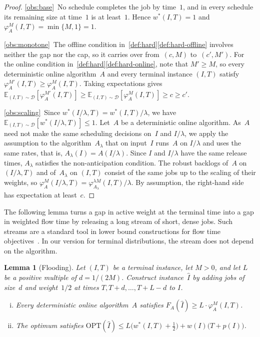 \documentclass[11pt,letterpaper]{article}
\makeatletter
\renewcommand\paragraph{\@startsection{paragraph}{4}{\z@}{\parskip}{-1em}{\normalfont\normalsize\bfseries}}
\newtheorem{lemma}[theorem]{Lemma}
\theoremstyle{definition}
\theoremstyle{remark}
\newcommand{\OPT}{{\mathrm{OPT}}}
\newcommand{\E}{\mathbb{E}}
\newcommand{\cD}{\mathcal{D}}
\makeatother
\begin{document}
\begin{proof}
\ref{obs:base}~No schedule completes the job by time~$1$, and in every schedule its remaining size at time~$1$ is at least~$1$. Hence $w^*(I,T)=1$ and $\varphi_A^M(I,T)=\min\{M,1\}=1$.

\ref{obs:monotone}~The offline condition in~\cref{def:hard}\ref{def:hard-offline} involves neither the gap nor the cap, so it carries over from~$(c,M)$ to~$(c',M')$. For the online condition in~\cref{def:hard}\ref{def:hard-online}, note that $M'\ge M$, so every deterministic online algorithm~$A$ and every terminal instance $(I,T)$ satisfy $\varphi_A^{M'}(I,T)\ge\varphi_A^M(I,T)$. Taking expectations gives $\E_{(I,T)\sim\cD}[\varphi_A^{M'}(I,T)]\ge\E_{(I,T)\sim\cD}[\varphi_A^M(I,T)]\ge c\ge c'$.

\ref{obs:scaling}~Since $w^*(I/\lambda,T)=w^*(I,T)/\lambda$, we have $\E_{(I,T)\sim\cD}[w^*(I/\lambda,T)]\le1$. Let~$A$ be a deterministic online algorithm. As~$A$ need not make the same scheduling decisions on~$I$ and $I/\lambda$, we apply the assumption to the algorithm~$A_\lambda$ that on input~$I$ runs~$A$ on $I/\lambda$ and uses the same rates, that is, $A_\lambda(I)=A(I/\lambda)$. Since $I$ and $I/\lambda$ have the same release times, $A_\lambda$ satisfies the non-anticipation condition. The robust backlogs of~$A$ on $(I/\lambda,T)$ and of~$A_\lambda$ on $(I,T)$ consist of the same jobs up to the scaling of their weights, so $\varphi_A^M(I/\lambda,T)=\varphi_{A_\lambda}^{\lambda M}(I,T)/\lambda$. By assumption, the right-hand side has expectation at least~$c$.
\end{proof}

\paragraph{Flooding.}
The following lemma turns a gap in active weight at the terminal time into a gap in weighted flow time by releasing a long stream of short, dense jobs. Such streams are a standard tool in lower bound constructions for flow time objectives~\cite{BecchettiLMP06,BansalC09,AzarLT22,MotwaniPT94,GuptaKLSY25,GuptaKLSY27}. In our version for terminal distributions, the stream does not depend on the algorithm.

\begin{samepage}
\begin{lemma}[Flooding]\label{lem:flooding}
Let $(I,T)$ be a terminal instance, let $M>0$, and let $L$ be a positive multiple of $d=1/(2M)$. Construct instance~$\hat I$ by adding jobs of size~$d$ and weight~$1/2$ at times $T,T+d,\dots,T+L-d$ to $I$.
\begin{enumerate}[(i)]
\item\label{it:flood-online} Every deterministic online algorithm~$A$ satisfies $F_A(\hat I)\ge L\cdot\varphi_A^M(I,T)$.
\item\label{it:flood-offline} The optimum satisfies $\OPT(\hat I)\le L\bigl(w^*(I,T)+\tfrac12\bigr)+w(I)\bigl(T+p(I)\bigr)$.
\end{enumerate}
\end{lemma}
\end{samepage}
\end{document}
